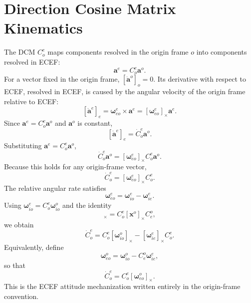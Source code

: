 \documentclass[11pt,oneside]{book}
\begin{document}
\section{Direction Cosine Matrix Kinematics}

The DCM $C_o^e$ maps components resolved in the origin frame $o$ into components resolved in ECEF:
\begin{equation}
\mathbf{a}^{e}=C_o^e\mathbf{a}^{o}.
\end{equation}
For a vector fixed in the origin frame, $[\dot{\mathbf{a}}^o]_o=0$. Its derivative with respect to ECEF, resolved in ECEF, is caused by the angular velocity of the origin frame relative to ECEF:
\begin{equation}
\left[
\dot{\mathbf{a}}^e
\right]_e
=
\boldsymbol{\omega}_{eo}^{e}\times\mathbf{a}^{e}
=
[\boldsymbol{\omega}_{eo}^{e}]_\times\mathbf{a}^{e}.
\end{equation}
Since $\mathbf{a}^e=C_o^e\mathbf{a}^o$ and $\mathbf{a}^o$ is constant,
\begin{equation}
\left[
\dot{\mathbf{a}}^e
\right]_e
=
\dot{C}_o^e\mathbf{a}^{o}.
\end{equation}
Substituting $\mathbf{a}^e=C_o^e\mathbf{a}^o$,
\begin{equation}
\dot{C}_o^e\mathbf{a}^{o}
=
[\boldsymbol{\omega}_{eo}^{e}]_\times C_o^e\mathbf{a}^{o}.
\end{equation}
Because this holds for any origin-frame vector,
\begin{equation}
\dot{C}_o^e
=
[\boldsymbol{\omega}_{eo}^{e}]_\times C_o^e.
\label{eq:dcm_kinematics_origin_left}
\end{equation}
The relative angular rate satisfies
\begin{equation}
\boldsymbol{\omega}_{eo}^{e}
=
\boldsymbol{\omega}_{io}^{e}
-
\boldsymbol{\omega}_{ie}^{e}.
\end{equation}
Using $\boldsymbol{\omega}_{io}^{e}=C_o^e\boldsymbol{\omega}_{io}^{o}$ and the identity
\begin{equation}
[C_o^e\mathbf{x}^{o}]_\times
=
C_o^e[\mathbf{x}^{o}]_\times C_e^o,
\end{equation}
we obtain
\begin{equation}
\boxed{
\dot{C}_o^e
=
C_o^e[\boldsymbol{\omega}_{io}^{o}]_\times
-
[\boldsymbol{\omega}_{ie}^{e}]_\times C_o^e.
}
\label{eq:dcm_kinematics_origin_to_ecef}
\end{equation}
Equivalently, define
\begin{equation}
\boldsymbol{\omega}_{eo}^{o}
=
\boldsymbol{\omega}_{io}^{o}
-
C_e^o\boldsymbol{\omega}_{ie}^{e},
\end{equation}
so that
\begin{equation}
\boxed{
\dot{C}_o^e
=
C_o^e[\boldsymbol{\omega}_{eo}^{o}]_\times.
}
\label{eq:dcm_kinematics_origin_relative}
\end{equation}
This is the ECEF attitude mechanization written entirely in the origin-frame convention.
\end{document}
